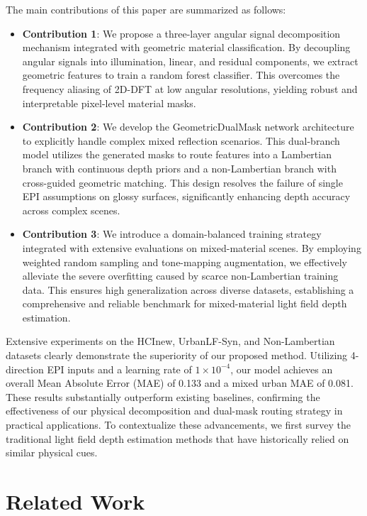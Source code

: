 \documentclass[lettersize,journal]{IEEEtran}
\begin{document}
The main contributions of this paper are summarized as follows:
\begin{itemize}
\item \textbf{Contribution 1}: We propose a three-layer angular signal decomposition mechanism integrated with geometric material classification. By decoupling angular signals into illumination, linear, and residual components, we extract geometric features to train a random forest classifier. This overcomes the frequency aliasing of 2D-DFT at low angular resolutions, yielding robust and interpretable pixel-level material masks.
\item \textbf{Contribution 2}: We develop the GeometricDualMask network architecture to explicitly handle complex mixed reflection scenarios. This dual-branch model utilizes the generated masks to route features into a Lambertian branch with continuous depth priors and a non-Lambertian branch with cross-guided geometric matching. This design resolves the failure of single EPI assumptions on glossy surfaces, significantly enhancing depth accuracy across complex scenes.
\item \textbf{Contribution 3}: We introduce a domain-balanced training strategy integrated with extensive evaluations on mixed-material scenes. By employing weighted random sampling and tone-mapping augmentation, we effectively alleviate the severe overfitting caused by scarce non-Lambertian training data. This ensures high generalization across diverse datasets, establishing a comprehensive and reliable benchmark for mixed-material light field depth estimation.
\end{itemize}

Extensive experiments on the HCInew, UrbanLF-Syn, and Non-Lambertian datasets clearly demonstrate the superiority of our proposed method. Utilizing 4-direction EPI inputs and a learning rate of $1 \times 10^{-4}$, our model achieves an overall Mean Absolute Error (MAE) of 0.133 and a mixed urban MAE of 0.081. These results substantially outperform existing baselines, confirming the effectiveness of our physical decomposition and dual-mask routing strategy in practical applications. To contextualize these advancements, we first survey the traditional light field depth estimation methods that have historically relied on similar physical cues.

\section{Related Work}
\end{document}
